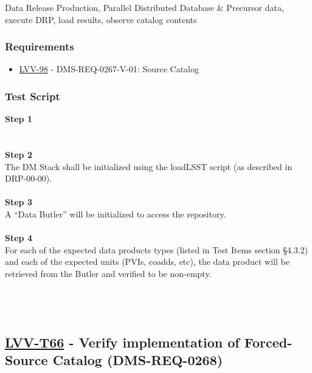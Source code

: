 Data Release Production, Parallel Distributed Database \& Precursor
data, execute DRP, load results, observe catalog contents

\hypertarget{requirements-42}{%
\subsubsection{Requirements}\label{requirements-42}}

\begin{itemize}
\tightlist
\item
  \href{https://jira.lsstcorp.org/browse/LVV-98}{LVV-98} -
  DMS-REQ-0267-V-01: Source Catalog
\end{itemize}

\hypertarget{test-script-42}{%
\subsubsection{Test Script}\label{test-script-42}}

\textbf{Step 1}\\
~\\
~\\
\textbf{Step 2}\\
The DM Stack shall be initialized using the loadLSST script (as
described in DRP-00-00).\\
~\\
\textbf{Step 3}\\
A ``Data Butler'' will be initialized to access the repository.\\
~\\
\textbf{Step 4}\\
For each of the expected data products types (listed in Test Items
section §4.3.2) and each of the expected units (PVIs, coadds, etc), the
data product will be retrieved from the Butler and verified to be
non-empty.\\
~\\
~\\
~\\

\hypertarget{lvv-t66---verify-implementation-of-forced-source-catalog-dms-req-0268}{%
\subsection{\texorpdfstring{\href{https://jira.lsstcorp.org/secure/Tests.jspa\#/testCase/LVV-T66}{LVV-T66}
- Verify implementation of Forced-Source Catalog
(DMS-REQ-0268)}{LVV-T66 - Verify implementation of Forced-Source Catalog (DMS-REQ-0268)}}\label{lvv-t66---verify-implementation-of-forced-source-catalog-dms-req-0268}}

